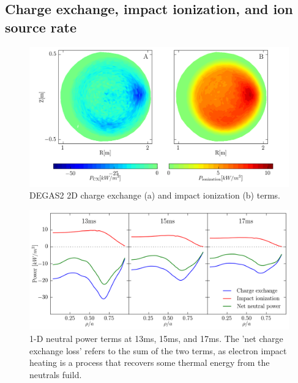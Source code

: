 \subsection{Charge exchange, impact ionization, and ion source rate}

\begin{figure}
    \centering
    \includegraphics{ion_transport_results/DEGAS2_power_terms_2d.png}
    \caption{DEGAS2 2D charge exchange (a) and impact ionization (b) terms.}
    \label{fig:DEGAS2_power_2d}
\end{figure}

\begin{figure}
    \centering
    \includegraphics{ion_transport_results/DEGAS2_power_terms_1d.png}
    \caption{1-D neutral power terms at 13ms, 15ms, and 17ms. The 'net charge exchange loss' refers to the sum of the two terms, as electron impact heating is a process that recovers some thermal energy from the neutrals fuild.}
    \label{fig:DEGAS2_power_1d}
\end{figure}


